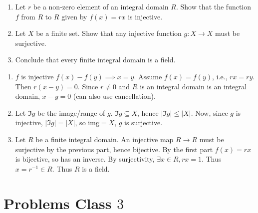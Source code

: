 \documentclass[10pt, a4paper]{article}
\begin{document}
\begin{problem}[Question $10$]
    \begin{enumerate}[label = (\alph*)]
        \item Let $r$ be a non-zero element of an integral domain $R$.
        Show that the function $f$ from $R$ to $R$ given by $f(x) = rx$ is injective.

        \item Let $X$ be a finite set.
        Show that any injective function $g : X \to X$ must be surjective.

        \item Conclude that every finite integral domain is a field.
    \end{enumerate}

    \begin{solution}
        \begin{enumerate}[label = (\alph*)]
            \item
            $f$ is injective $f(x) - f(y) \implies x = y$.
            Assume $f(x) = f(y)$,
            i.e.,
            $rx = ry$.
            Then $r(x - y) = 0$.
            Since $r \neq 0$ and $R$ is an integral domain is an integral domain,
            $x - y = 0$
            (can also use cancellation).

            \item
            Let $\Im{g}$ be the image/range of $g$.
            $\Im{g} \subseteq X$,
            hence $|\Im{g}| \leq |X|$.
            Now,
            since $g$ is injective,
            $|\Im{g}| = |X|$,
            so $\mathrm{img} = X$,
            $g$ is surjective.

            \item Let $R$ be a finite integral domain.
            An injective map $R \to R$ must be surjective by the previous part,
            hence bijective.
            By the first part $f(x) = rx$ is bijective,
            so has an inverse.
            By surjectivity,
            $\exists x \in R, rx = 1$.
            Thus $x = r ^ {-1} \in R$.
            Thus $R$ is a field.
        \end{enumerate}
    \end{solution}
\end{problem}

\newpage

\section{Problems Class \texorpdfstring{$3$}{}}
\end{document}
